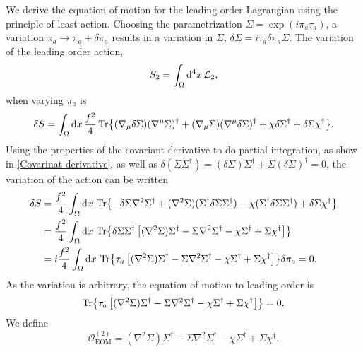 We derive the equation of motion for the leading order Lagrangian using the principle of least action.
Choosing the parametrization $\Sigma = \exp(i \pi_a \tau_a)$, a variation $\pi_a \rightarrow \pi_a + \delta \pi_a$ results in a variation in $\Sigma$, $\delta \Sigma = i \tau_a \delta \pi_a \Sigma $.
The variation of the leading order action,
\begin{equation}
    S_2 = \int_\Omega \dd^4x \, \mathcal{L}_2,
\end{equation}
when varying $\pi_a$ is 
\begin{align*}
    \delta S = \int_\Omega \dd x \, \frac{f^2}{4}
    \Tr{
        (\nabla_\mu \delta \Sigma) (\nabla^\mu \Sigma)^\dagger
        + (\nabla_\mu \Sigma) (\nabla^\mu \delta \Sigma)^\dagger
        + \chi \delta \Sigma^\dagger + \delta \Sigma \chi^\dagger
    }.
\end{align*}
Using the properties of the covariant derivative to do partial integration, as show in \autoref{Covarinat derivative}, as well as $\delta(\Sigma \Sigma^\dagger) = (\delta\Sigma)\Sigma^\dagger + \Sigma (\delta \Sigma)^\dagger = 0$, the variation of the action can be written
\begin{align*}
    \delta S 
    & = \frac{f^2}{4} \int_\Omega \dd x\, 
    \Tr{
        - \delta \Sigma \nabla^2 \Sigma^\dagger
        + (\nabla^2 \Sigma) (\Sigma^\dagger \delta \Sigma \Sigma^\dagger)
        - \chi (\Sigma^\dagger \delta \Sigma \Sigma^\dagger)
        + \delta \Sigma \chi^\dagger
    } \\
    & = 
    \frac{f^2}{4} \int_\Omega \dd x\, 
    \Tr{
        \delta \Sigma \Sigma^\dagger 
        \left[
            (\nabla^2 \Sigma)\Sigma^\dagger
            - \Sigma \nabla^2 \Sigma^\dagger
            - \chi \Sigma^\dagger
            + \Sigma \chi^\dagger
        \right]
        } \\
    & = 
    i \frac{f^2}{4} \int_\Omega \dd x\, 
    \Tr{\tau_a 
    \left[
         (\nabla^2 \Sigma)\Sigma^\dagger
        - \Sigma \nabla^2 \Sigma^\dagger
        - \chi \Sigma^\dagger
        + \Sigma \chi^\dagger
    \right]
    } 
    \delta \pi_a = 0.
\end{align*}  
As the variation is arbitrary, the equation of motion to leading order is
\begin{equation}
    \Tr{
        \tau_a 
        \left[
            (\nabla^2 \Sigma)\Sigma^\dagger
            - \Sigma \nabla^2 \Sigma^\dagger
            - \chi \Sigma^\dagger
            + \Sigma \chi^\dagger
        \right]
    } = 0.
\end{equation}
We define
\begin{equation}
    \mathcal O_\text{EOM}^{(2)}
    = 
    (\nabla^2 \Sigma)\Sigma^\dagger
    - \Sigma \nabla^2 \Sigma^\dagger
    - \chi \Sigma^\dagger
    + \Sigma \chi^\dagger.
\end{equation}


